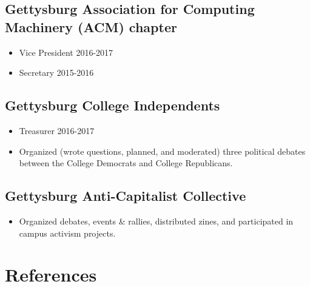 \documentclass[11pt]{article}
\begin{document}
\subsection*{Gettysburg Association for Computing Machinery (ACM) chapter}
\begin{itemize}[noitemsep]
	\item Vice President \hfill 2016-2017
	\item Secretary \hfill 2015-2016
\end{itemize}
 
\subsection*{Gettysburg College Independents} 
\begin{itemize}[noitemsep]
	\item Treasurer \hfill 2016-2017
    \item Organized (wrote questions, planned, and moderated) three political debates between the College Democrats and College Republicans. 
\end{itemize}

\subsection*{Gettysburg Anti-Capitalist Collective}
\begin{itemize}[noitemsep]
    \item Organized debates, events \& rallies, distributed zines, and participated in campus activism projects.
\end{itemize}


\section*{References}
\end{document}
